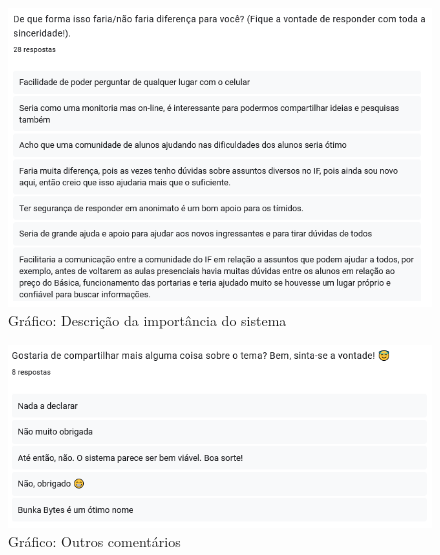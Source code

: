 \begin{figure}[htb]
\centering
\caption{Gráfico: Descrição da importância do sistema}
\label{Grafico importancia do sistema}
\includegraphics[width=1.0\textwidth]{anexos/Imagens_PesquisaAceitacao/p09.png}
\end{figure}
\FloatBarrier

\begin{figure}[htb]
\centering
\caption{Gráfico: Outros comentários}
\label{Grafico comentarios}
\includegraphics[width=1.0\textwidth]{anexos/Imagens_PesquisaAceitacao/p010.png}
\end{figure}
\FloatBarrier